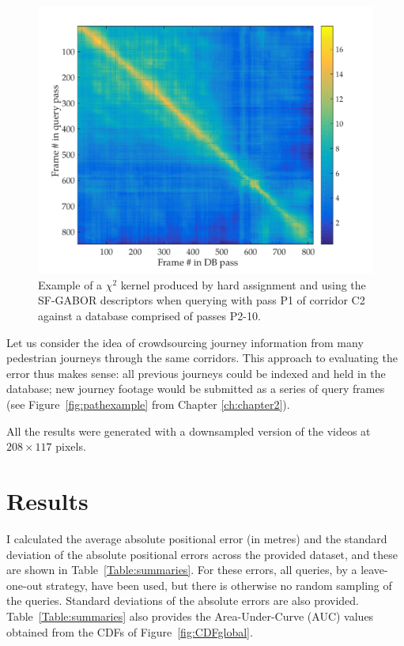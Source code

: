 \begin{figure}[h]
\centering
\includegraphics[width=\linewidth]{./gfx/Chapter04/kernel.pdf}
\caption{Example of a $\chi^2$ kernel produced by hard assignment and using the SF-GABOR descriptors when querying with pass P1 of corridor C2 against a database comprised of passes P2-10.}
\label{fig:kernel}
\end{figure}

Let us consider the idea of crowdsourcing journey information from many pedestrian journeys through the same corridors. This approach to evaluating the error thus makes sense:  all previous journeys could be indexed and held in the database; new journey footage would be submitted as a series of query frames (see Figure~\ref{fig:pathexample} from Chapter \ref{ch:chapter2}).    

All the results were generated with a downsampled version of the videos at $208 \times 117$ pixels. 




\section{Results}
\label{sec:ch4results}

I calculated the average absolute positional error (in metres) and the standard deviation of the absolute positional errors across the provided dataset, and these are shown in Table~\ref{Table:summaries}. For these errors, all queries, by a leave-one-out strategy, have been used, but there is otherwise no random sampling of the queries.  Standard deviations of the absolute errors are also provided.  Table~\ref{Table:summaries} also provides the Area-Under-Curve (AUC) values obtained from the CDFs of Figure~\ref{fig:CDFglobal}.


